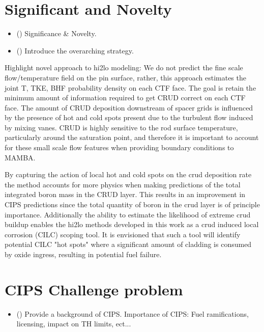 \section{Significant and Novelty}

\begin{itemize}
    \item (\checkmark) Significance \& Novelty.
    \item (\checkmark) Introduce the overarching strategy.
\end{itemize}

Highlight novel approach to hi2lo modeling:  We do not predict the fine scale flow/temperature field on the pin surface, rather, this approach estimates the joint T, TKE, BHF probability density on each CTF face.  The goal is retain the minimum amount of information required to get CRUD correct on each CTF face.  The amount of CRUD deposition downstream of spacer grids is influenced by the presence of hot and cold spots present due to the turbulent flow induced by mixing vanes.  CRUD is highly sensitive to the rod surface temperature, particularly around the saturation point, and therefore it is important to account for these small scale flow features when providing boundary conditions to MAMBA.

By capturing the action of local hot and cold spots on the crud deposition rate the method accounts for more physics when making predictions of the total integrated boron mass in the CRUD layer.  This results in an improvement in CIPS predictions since the total quantity of boron in the crud layer is of principle importance.  Additionally the ability to estimate the likelihood of extreme crud buildup enables the hi2lo methods developed in this work as a crud induced local corrosion (CILC) scoping tool.  It is envisioned that such a tool will identify potential CILC "hot spots" where a significant amount of cladding is consumed by oxide ingress, resulting in potential fuel failure.


\section{CIPS Challenge problem}

\begin{itemize}
    \item (\checkmark) Provide a background of CIPS.  Importance of CIPS:  Fuel ramifications, licensing, impact on TH limits, ect...
\end{itemize}


